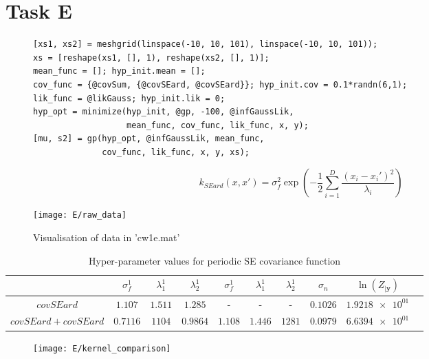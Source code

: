 \documentclass[11pt, twocolumn]{article}
\begin{document}
\section{Task E}

\begin{figure*}[h]
\begin{lstlisting}[caption=Code to train and calculate prediction intervals of a 2D GP with SE ARD kernel, captionpos=b, basicstyle=\small, frame=tlrb]
[xs1, xs2] = meshgrid(linspace(-10, 10, 101), linspace(-10, 10, 101));
xs = [reshape(xs1, [], 1), reshape(xs2, [], 1)];
mean_func = []; hyp_init.mean = [];
cov_func = {@covSum, {@covSEard, @covSEard}}; hyp_init.cov = 0.1*randn(6,1);
lik_func = @likGauss; hyp_init.lik = 0;
hyp_opt = minimize(hyp_init, @gp, -100, @infGaussLik, 
                   mean_func, cov_func, lik_func, x, y);
[mu, s2] = gp(hyp_opt, @infGaussLik, mean_func, 
              cov_func, lik_func, x, y, xs);
\end{lstlisting}
\label{lst:E}
\end{figure*}


\[k_{SEard}(x, x') = \sigma_f^2 \exp(-\frac{1}{2}\sum_{i=1}^{D} \frac{(x_i - x_i')^2}{\lambda_i})\]

\begin{figure}[h]
    \centering
    \texttt{[image: E/raw\_data]}
    \caption{Visualisation of data in 'cw1e.mat'}
    \label{fig:E_data_vis}
\end{figure}

\begin{table*}[h]
    \centering
    \small
    \begin{tabular}{|c|c|c|c|c|c|c|c|c|c|}
        \hline
         & $\sigma_f^1$ & $\lambda_1^1$ & $\lambda_2^1$ & $\sigma_f^1$ & $\lambda_1^1$ & $\lambda_2^1$ & $\sigma_n$ & $\ln(Z_{|\textbf{y}})$ \\
        \hline
        $covSEard$ & $1.107$ & $1.511$ & $1.285$ & - & - & - & $0.1026$ & $\num{1.9218e+01}$ \\ 
        $covSEard + covSEard$ & $0.7116$ & $1104$ & $0.9864$ & $1.108$ & $1.446$ & $1281$ & $0.0979$ & $\num{6.6394e+01}$ \\
        \hline
    \end{tabular}
    \caption{Hyper-parameter values for periodic SE covariance function}
    \label{table:E_hyper_parameters}
\end{table*}

\begin{figure*}[h]
    \centering
    \texttt{[image: E/kernel\_comparison]}
    \caption{}
    \label{fig:E_kernel_compare}
\end{figure*}

    
\end{document}
